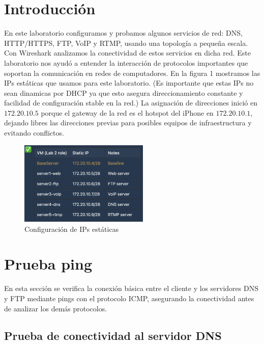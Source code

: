 \documentclass[10pt]{article}
\begin{document}
\section*{Introducción}
En este laboratorio configuramos y probamos algunos servicios de red: DNS, HTTP/HTTPS, FTP, VoIP y RTMP, usando una topología a pequeña escala. Con Wireshark analizamos la conectividad de estos servicios en dicha red. Este laboratorio nos ayudó a entender la interacción de protocolos importantes que soportan la comunicación en redes de computadores. En la figura 1 mostramos las IPs estáticas que usamos para este laboratorio. (Es importante que estas IPs no sean dinamicas por DHCP ya que esto asegura direccionamiento constante y facilidad de configuración stable en la red.) La asignación de direcciones inició en $172.20.10.5$ porque el gateway de la red es el hotspot del iPhone en $172.20.10.1$, dejando libres las direcciones previas para posibles equipos de infraestructura y evitando conflictos.


\begin{figure}[H]
    \centering
    \includegraphics[width=0.55\textwidth]{lab-02-screenshots/server-ips.png}
    \caption{Configuración de IPs estáticas}
\end{figure}


\renewcommand{\thesection}{8.\arabic{section}}
\setcounter{section}{0}
\section{Prueba ping}

En esta sección se verifica la conexión básica entre el cliente y los servidores DNS y FTP mediante pings con el protocolo ICMP, asegurando la conectividad antes de analizar los demás protocolos.

\subsection{Prueba de conectividad al servidor DNS}
\end{document}
